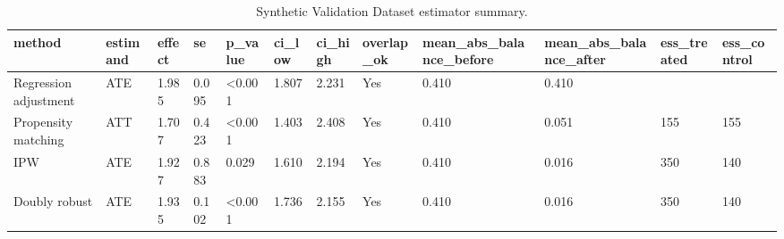 \begin{table}
\caption{Synthetic Validation Dataset estimator summary.}
\label{tab:synthetic_validation_dataset-estimators}
\begin{tabular}{llllllllllll}
\toprule
method & estimand & effect & se & p_value & ci_low & ci_high & overlap_ok & mean_abs_balance_before & mean_abs_balance_after & ess_treated & ess_control \\
\midrule
Regression adjustment & ATE & 1.985 & 0.095 & <0.001 & 1.807 & 2.231 & Yes & 0.410 & 0.410 &  &  \\
Propensity matching & ATT & 1.707 & 0.423 & <0.001 & 1.403 & 2.408 & Yes & 0.410 & 0.051 & 155 & 155 \\
IPW & ATE & 1.927 & 0.883 & 0.029 & 1.610 & 2.194 & Yes & 0.410 & 0.016 & 350 & 140 \\
Doubly robust & ATE & 1.935 & 0.102 & <0.001 & 1.736 & 2.155 & Yes & 0.410 & 0.016 & 350 & 140 \\
\bottomrule
\end{tabular}
\end{table}
